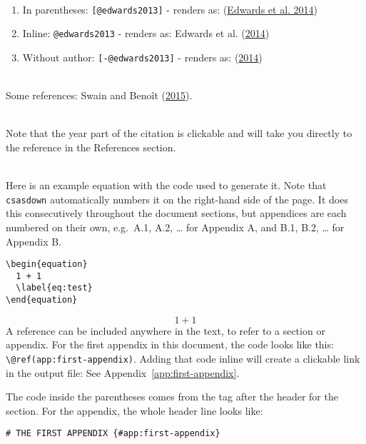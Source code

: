\documentclass[12pt]{article}\usepackage[]{graphicx}\usepackage[]{color}
\begin{document}
~\\
\begin{enumerate}
\def\labelenumi{\arabic{enumi}.}

\item
  In parentheses: \texttt{{[}@edwards2013{]}} - renders as: (\protect\hyperlink{ref-edwards2013}{Edwards et al. 2014})
\item
  Inline: \texttt{@edwards2013} - renders as: Edwards et al. (\protect\hyperlink{ref-edwards2013}{2014})
\item
  Without author: \texttt{{[}-@edwards2013{]}} - renders as: (\protect\hyperlink{ref-edwards2013}{2014})
\end{enumerate}
~\\

Some references: Swain and Benoît (\protect\hyperlink{ref-swainbenoit2015}{2015}).

~\\

Note that the year part of the citation is clickable and will take you directly to the reference in the References section.

~\\

Here is an example equation with the code used to generate it. Note that \texttt{csasdown} automatically numbers it on the right-hand side of the page. It does this consecutively throughout the document sections, but appendices are each numbered on their own, e.g.~A.1, A.2, \ldots{} for Appendix A, and B.1, B.2, \ldots{} for Appendix B.
\begin{verbatim}
\begin{equation}
  1 + 1
  \label{eq:test}
\end{equation}
\end{verbatim}
\begin{equation}
  1 + 1
  \label{eq:test}
\end{equation}
A reference can be included anywhere in the text, to refer to a section or appendix. For the first appendix in this document, the code looks like this: \texttt{\textbackslash{}@ref(app:first-appendix)}. Adding that code inline will create a clickable link in the output file: See Appendix~\ref{app:first-appendix}.

The code inside the parentheses comes from the tag after the header for the section. For the appendix, the whole header line looks like:

\texttt{\#\ THE\ FIRST\ APPENDIX\ \{\#app:first-appendix\}}
\end{document}
